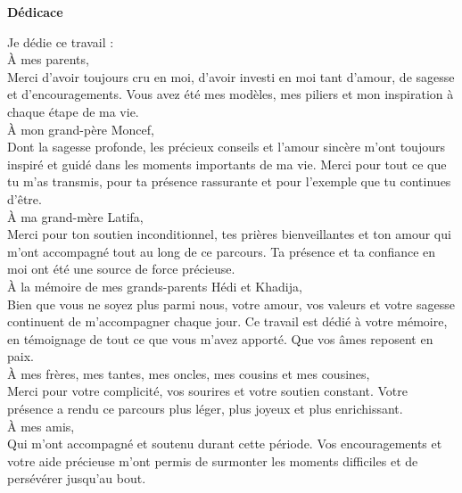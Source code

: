 \begin{titlepage}
\begin{center}

\vspace*{2.5cm} %

\textbf{\Large Dédicace}

\vspace*{1.5cm} %

\begin{itshape} %

Je dédie ce travail :\\[0.8cm]

À mes parents,\\
Merci d'avoir toujours cru en moi, d'avoir investi en moi tant d'amour, de sagesse et d'encouragements. Vous avez été mes modèles, mes piliers et mon inspiration à chaque étape de ma vie.\\[0.5cm]

À mon grand-père Moncef,\\
Dont la sagesse profonde, les précieux conseils et l'amour sincère m'ont toujours inspiré et guidé dans les moments importants de ma vie. Merci pour tout ce que tu m'as transmis, pour ta présence rassurante et pour l'exemple que tu continues d'être.\\[0.5cm]

À ma grand-mère Latifa,\\
Merci pour ton soutien inconditionnel, tes prières bienveillantes et ton amour qui m'ont accompagné tout au long de ce parcours. Ta présence et ta confiance en moi ont été une source de force précieuse.\\[0.5cm]

À la mémoire de mes grands-parents Hédi et Khadija,\\
Bien que vous ne soyez plus parmi nous, votre amour, vos valeurs et votre sagesse continuent de m'accompagner chaque jour. Ce travail est dédié à votre mémoire, en témoignage de tout ce que vous m'avez apporté. Que vos âmes reposent en paix.\\[0.5cm]

À mes frères, mes tantes, mes oncles, mes cousins et mes cousines,\\
Merci pour votre complicité, vos sourires et votre soutien constant. Votre présence a rendu ce parcours plus léger, plus joyeux et plus enrichissant.\\[0.5cm]

À mes amis,\\
Qui m'ont accompagné et soutenu durant cette période. Vos encouragements et votre aide précieuse m'ont permis de surmonter les moments difficiles et de persévérer jusqu'au bout.\\[0.5cm]


\end{itshape}
\end{center}
\end{titlepage}
